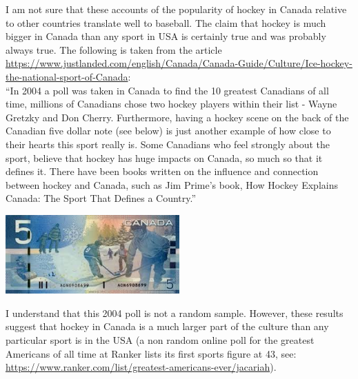 \documentclass[11pt]{article}
\begin{document}
I am not sure that these accounts of the popularity of hockey in Canada 
relative to other countries translate well to baseball.  The claim that 
hockey is much bigger in Canada than any sport in USA is certainly true and 
was probably always true.  
The following is taken from the article 
\url{https://www.justlanded.com/english/Canada/Canada-Guide/Culture/Ice-hockey-the-national-sport-of-Canada}: \\

\noindent ``In 2004 a poll was taken in Canada to find the 10 greatest 
Canadians of all time, millions of Canadians chose two hockey players within 
their list - Wayne Gretzky and Don Cherry.  Furthermore, having a hockey scene 
on the back of the Canadian five dollar note (see below) is just another 
example of how close to their hearts this sport really is. Some Canadians who 
feel strongly about the sport, believe that hockey has huge impacts on Canada, 
so much so that it defines it. There have been books written on the influence 
and connection between hockey and Canada, such as Jim Prime's book, How Hockey 
Explains Canada: The Sport That Defines a Country.'' \\

\begin{center}
\includegraphics[width=0.50\textwidth]{canada5dollarbill.jpeg}
\end{center}

I understand that this 2004 poll is not a random sample.  However, these 
results suggest that hockey in Canada is a much larger part of the culture 
than any particular sport is in the USA (a non random online poll for the 
greatest Americans of all time at Ranker lists its first sports figure 
at 43, see:  
\url{https://www.ranker.com/list/greatest-americans-ever/jacariah}).  
\end{document}
